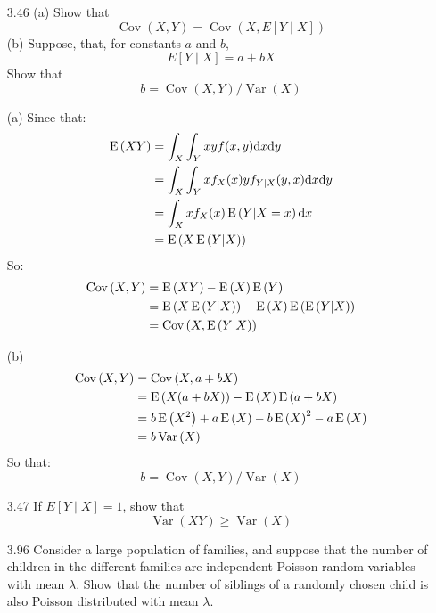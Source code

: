 \documentclass[en,hazy,blue,12pt,device = normal]{elegantnote}
\begin{document}
\begin{enumerate}
    \item[3.46](a) Show that
    $$
    \operatorname{Cov}(X, Y)=\operatorname{Cov}(X, E[Y \mid X])
    $$
    (b) Suppose, that, for constants $a$ and $b$,
    $$
    E[Y \mid X]=a+b X
    $$
    Show that
    $$
    b=\operatorname{Cov}(X, Y) / \operatorname{Var}(X)
    $$

    \begin{tcolorbox}
        \sol

        (a) Since that:
        \begin{align*}
            \operatorname E\left(XY\right) &= \int_X\int_Y xyf(x,y)\text{d} x \text{d} y \\
            &= \int_X\int_Y xf_X(x)y f_{Y|X} (y,x)\text{d} x \text{d} y \\
            &= \int_X xf_X(x)\operatorname E\left(Y|X = x\right)\text{d} x \\
            &= \operatorname E\left(X\operatorname E\left(Y|X\right)\right)
        \end{align*}
        So:
        \begin{align*}
            \operatorname{Cov}\left(X,Y\right) &= \operatorname E\left(XY\right) - \operatorname E\left(X\right)\operatorname E\left(Y\right) \\
            &= \operatorname E\left(X\operatorname E\left(Y|X\right)\right) - \operatorname E\left(X\right)\operatorname E\left(\operatorname E\left(Y|X\right)\right)\\
            &= \operatorname{Cov}\left(X, \operatorname E\left(Y|X\right)\right)
        \end{align*}

        (b)
        \begin{align*}
            \operatorname{Cov}\left(X,Y\right) &= \operatorname{Cov}\left(X,a+bX\right) \\
            &= \operatorname E\left(X(a+bX)\right) - \operatorname E\left(X\right)\operatorname E\left(a+bX\right) \\
            &= b\operatorname E\left(X^2\right) +a\operatorname E\left(X\right) -b\operatorname E\left(X\right)^2 - a\operatorname E\left(X\right)\\
            &= b\operatorname{Var}\left(X\right)
        \end{align*}
        So that:
        $$
        b=\operatorname{Cov}(X, Y) / \operatorname{Var}(X)
        $$
    \end{tcolorbox}

    \item[3.47] If $E[Y \mid X]=1$, show that
$$
\operatorname{Var}(X Y) \geqslant \operatorname{Var}(X)
$$

    \begin{tcolorbox}
        \sol


    \end{tcolorbox}

    \item[3.96]Consider a large population of families, and suppose that the number of children in the different families are independent Poisson random variables with mean \(\lambda\). Show that the number of siblings of a randomly chosen child is also Poisson distributed with mean \(\lambda\).
    

\end{enumerate}
\end{document}

